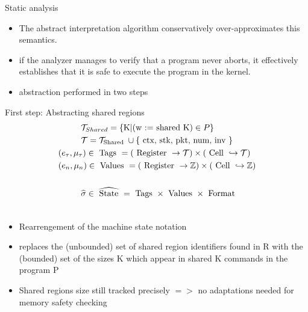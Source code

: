 \documentclass[aspectratio=169]{beamer}
\begin{document}
\begin{frame}{Static analysis}
\begin{itemize}
  \item The abstract interpretation algorithm conservatively over-approximates this semantics.
  \item if the analyzer manages to verify that a program never aborts, it effectively
establishes that it is safe to execute the program in the kernel.
\item abstraction performed in two steps
  \end{itemize}
\end{frame}

\begin{frame}{First step: Abstracting shared regions}
$$
\begin{aligned}
& \hspace{1cm} \mathcal{T}_{Shared} = \{\text{K} | \text{(w := shared  K)} \in P \} \\
& \hspace{1cm} \mathcal{T}=\mathcal{T}_{\text {Shared }} \cup\{\text { ctx, stk, pkt, num, inv }\} \\
& \left(e_\tau, \mu_\tau\right) \in \text { Tags } =(\text { Register } \rightarrow \mathcal{T}) \times(\text { Cell } \hookrightarrow \mathcal{T}) \\
& \left(e_n, \mu_n\right) \in \text { Values }=(\text { Register } \rightarrow \mathbb{Z}) \times(\text { Cell } \hookrightarrow \mathbb{Z}) \\
& \\
& \vspace{1cm} \hspace{1cm} \widehat{\sigma} \in \widehat{\text { State }}=\text { Tags } \times \text { Values } \times \text { Format } \\
&
\end{aligned}
$$

\begin{itemize}
    \item Rearrengement of the machine state notation
    \item replaces the (unbounded) set of shared region
identifiers found in R with the (bounded) set of the sizes K
which appear in shared K commands in the program P
\item Shared regions size still tracked precisely $=>$ no adaptations needed for memory safety checking
\end{itemize}
\end{frame}
\end{document}
